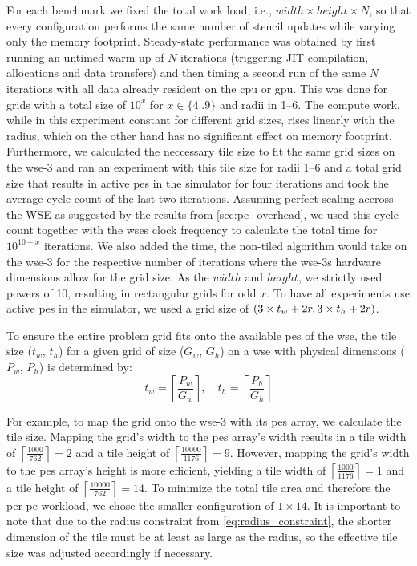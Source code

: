 For each benchmark we fixed the total work load, i.e., $width\times height\times N$, so that every configuration performs the same number of stencil updates while varying only the memory footprint. Steady-state performance was obtained by first running an untimed warm-up of $N$ iterations (triggering JIT compilation, allocations and data transfers) and then timing a second run of the same $N$ iterations with all data already resident on the \ac{cpu} or \ac{gpu}. This was done for grids with a total size of $10^x$ for $x \in \{4..9\}$ and radii in \numrange{1}{6}.
The compute work, while in this experiment constant for different grid sizes, rises linearly with the radius, which on the other hand has no significant effect on memory footprint.
Furthermore, we calculated the neccessary tile size to fit the same grid sizes on the \ac{wse}-3 and ran an experiment with this tile size for radii \numrange{1}{6} and a total grid size that results in  active \acp{pe} in the simulator for four iterations and took the average cycle count of the last two iterations.
Assuming perfect scaling accross the WSE as suggested by the results from \autoref{sec:pe_overhead}, we used this cycle count together with the \ac{wse}s clock frequency to calculate the total time for $10^{10-x}$ iterations.
We also added the time, the non-tiled algorithm would take on the \ac{wse}-3 for the respective number of iterations where the \ac{wse}-3s hardware dimensions allow for the grid size.
As the $width$ and $height$, we strictly used powers of 10, resulting in rectangular grids for odd $x$.
To have all experiments use  active \acp{pe} in the simulator, we used a grid size of $\left(3\times t_w + 2r, 3\times t_h + 2r \right)$.

To ensure the entire problem grid fits onto the available \acp{pe} of the \ac{wse}, the tile size ($t_w$, $t_h$) for a given grid of size ($G_w$, $G_h$) on a \ac{wse} with physical dimensions ($P_w$, $P_h$) is determined by:
\begin{equation}
    t_w = \left\lceil \frac{P_w}{G_w} \right\rceil, \quad t_h = \left\lceil \frac{P_h}{G_h} \right\rceil
\end{equation}

For example, to map the  grid onto the \ac{wse}-3 with its  \acp{pe} array, we calculate the tile size. Mapping the grid's width to the \acp{pe} array's width results in a tile width of $\left\lceil \frac{1000}{762} \right\rceil = 2$ and a tile height of $\left\lceil \frac{10000}{1176} \right\rceil = 9$. However, mapping the grid's width to the \acp{pe} array's height is more efficient, yielding a tile width of $\left\lceil \frac{1000}{1176} \right\rceil = 1$ and a tile height of $\left\lceil \frac{10000}{762} \right\rceil = 14$. To minimize the total tile area and therefore the per-\ac{pe} workload, we chose the smaller configuration of $1 \times 14$. It is important to note that due to the radius constraint from \autoref{eq:radius_constraint}, the shorter dimension of the tile must be at least as large as the radius, so the effective tile size was adjusted accordingly if necessary.

